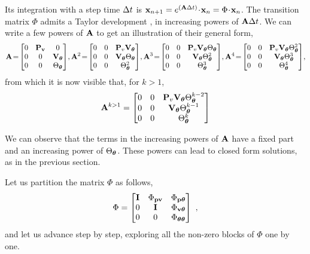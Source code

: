 Its integration with a step time $\Delta t$ is ${\bf x}_{n+1}= e^{({\bf A}\Delta t)}\!\cdot\!{\bf x}_n=\Phi\!\cdot\!{\bf x}_n$. 
The transition matrix $\Phi$ admits a Taylor development , in increasing powers of ${\bf A}\Delta t$.
We can write a few powers of ${\bf A}$ to get an illustration of their general form,
%
\begin{equation}
\bfA \!=\! \begin{bmatrix}
0 & \bfP_\bfv & 0 \\
0 & 0 & \bfV_\bftheta \\
0 & 0 & \Theta_\bftheta
\end{bmatrix}
\!,
\bfA^2 \!=\! 
\begin{bmatrix} 
0 & 0 & \bfP_v\bfV_\bftheta \\ 
0 & 0 & \bfV_\bftheta\Theta_\bftheta \\
0 & 0 & \Theta_\bftheta^2
\end{bmatrix}
\!,
\bfA^3 \!=\! 
\begin{bmatrix} 
0 & 0 & \bfP_v\bfV_\bftheta\Theta_\bftheta \\ 
0 & 0 & \bfV_\bftheta\Theta_\bftheta^2 \\
0 & 0 & \Theta_\bftheta^3
\end{bmatrix}
\!,
\bfA^4 \!=\! 
\begin{bmatrix} 
0 & 0 & \bfP_v\bfV_\bftheta\Theta_\bftheta^2 \\ 
0 & 0 & \bfV_\bftheta\Theta_\bftheta^3 \\
0 & 0 & \Theta_\bftheta^4
\end{bmatrix}
\!,
\end{equation}
%
from which it is now visible that, for $k>1$,
%
\begin{equation}
{\bf A}^{k>1} = 
\begin{bmatrix} 
0 & 0 & {\bf P}_v{\bf V}_{\bm \theta}\Theta_{\bm \theta}^{k-2} \\ 
0 & 0 & {\bf V}_{\bm \theta}\Theta_{\bm \theta}^{k-1} \\
0 & 0 & \Theta_{\bm \theta}^k
\end{bmatrix}
\end{equation}

We can observe that the terms in the increasing powers of ${\bf A}$ have a fixed part and an increasing power of $\Theta_{\bm \theta}$. 
These powers can lead to closed form solutions, as in the previous section. 


Let us partition the matrix $\Phi$ as follows,
%
\begin{equation}
\Phi = \begin{bmatrix}
{\bf I} & \Phi_{{\bf p}{\bf v}} & \Phi_{{\bf p}{\bm \theta}} \\
0 & {\bf I} & \Phi_{{\bf v}{\bm \theta}} \\
0 & 0 & \Phi_{{\bm \theta}{\bm \theta}}
\end{bmatrix}~,
\end{equation}
%
and let us advance step by step, exploring all the non-zero blocks of $\Phi$ one by one. 

